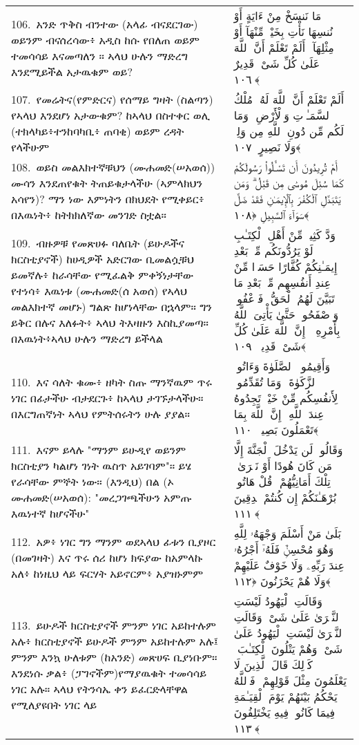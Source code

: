 \documentclass[11pt,a4paper,oneside]{article}%
\newcommand{\mytextarabic}[1]{\textarabic{ #1 \flushright}}
\begin{document}
\begin{longtable}{%
  @{}
    p{}
  @{~~~}
    p{}
    @{}
}
106.\ አንድ ጥቅስ ብንተው (አላፊ ብናደርገው) ወይንም ብናሰረሳው፥ አዲስ ከሱ የበለጠ ወይም ተመሳሳይ እናመጣለን ። ኣላህ ሁሉን ማድረግ እንደሚይችል አታዉቁም ወይ? &  \mytextarabic{مَا نَنسَخْ مِنْ ءَايَةٍ أَوْ نُنسِهَا نَأْتِ بِخَيْرٍۢ مِّنْهَآ أَوْ مِثْلِهَآ ۗ أَلَمْ تَعْلَمْ أَنَّ ٱللَّهَ عَلَىٰ كُلِّ شَىْءٍۢ قَدِيرٌ ﴿١٠٦﴾}\\
107.\ የመሬትና(የምድርና) የሰማይ ግዛት (ስልጣን) የኣላህ እንደሆነ አታውቁም? ከኣላህ በስተቀር ወሊ (ተክላካይ፥ተንከባካቢ፥ ጠባቂ) ወይም ረዳት የላችሁም &  \mytextarabic{ أَلَمْ تَعْلَمْ أَنَّ ٱللَّهَ لَهُۥ مُلْكُ ٱلسَّمَـٰوَٟتِ وَٱلْأَرْضِ ۗ وَمَا لَكُم مِّن دُونِ ٱللَّهِ مِن وَلِىٍّۢ وَلَا نَصِيرٍ ﴿١٠٧﴾}\\
108.\ ወይስ መልእክተኛቹህን (ሙሐመድ(ሠአወሰ)) ሙሳን እንደጠየቁት ትጠይቁታላችሁ (ኣምላክህን አሳየን)? ማን ነው እምነትን በክህደት የሚቀይር፥ በእዉነት፥ ከትክክለኛው መንገድ ስቷል። &  \mytextarabic{ أَمْ تُرِيدُونَ أَن تَسْـَٔلُوا۟ رَسُولَكُمْ كَمَا سُئِلَ مُوسَىٰ مِن قَبْلُ ۗ وَمَن يَتَبَدَّلِ ٱلْكُفْرَ بِٱلْإِيمَـٰنِ فَقَدْ ضَلَّ سَوَآءَ ٱلسَّبِيلِ ﴿١٠٨﴾}\\
109.\ ብዙዎቹ የመጽሀፉ ባለቤት (ይሁዶችና ክርስቲያኖች) ከሀዲዎች አድርገው ቢመልሷቹህ ይመኛሉ፥ ከራሳቸው የሚፈልቅ ምቀኝነታቸው የተነሳ፥ እዉነቱ (ሙሐመድ(ሰ አወሰ) የኣላህ መልእክተኛ መሆኑ) ግልጽ ከሆነላቸው በኋላም። ግን ይቅር በሉና እለፉት፥ ኣላህ ትእዛዙን እስኪያመጣ። በእዉነት፥ኣላህ ሁሉን ማድረግ ይችላል  &  \mytextarabic{وَدَّ كَثِيرٌۭ مِّنْ أَهْلِ ٱلْكِتَـٰبِ لَوْ يَرُدُّونَكُم مِّنۢ بَعْدِ إِيمَـٰنِكُمْ كُفَّارًا حَسَدًۭا مِّنْ عِندِ أَنفُسِهِم مِّنۢ بَعْدِ مَا تَبَيَّنَ لَهُمُ ٱلْحَقُّ ۖ فَٱعْفُوا۟ وَٱصْفَحُوا۟ حَتَّىٰ يَأْتِىَ ٱللَّهُ بِأَمْرِهِۦٓ ۗ إِنَّ ٱللَّهَ عَلَىٰ كُلِّ شَىْءٍۢ قَدِيرٌۭ ﴿١٠٩﴾}\\
110.\ እና ሳለት ቁሙ፥ ዘካት ስጡ ማንኛዉም ጥሩ ነገር በፊታችሁ ብታደርጉ፥ ከኣላህ ታገኙታላችሁ። በእርግጠኛነት ኣላህ የምትሰሩትን ሁሉ ያያል። &  \mytextarabic{ وَأَقِيمُوا۟ ٱلصَّلَوٰةَ وَءَاتُوا۟ ٱلزَّكَوٰةَ ۚ وَمَا تُقَدِّمُوا۟ لِأَنفُسِكُم مِّنْ خَيْرٍۢ تَجِدُوهُ عِندَ ٱللَّهِ ۗ إِنَّ ٱللَّهَ بِمَا تَعْمَلُونَ بَصِيرٌۭ ﴿١١٠﴾}\\
111.\ እናም ይላሉ "ማንም ይሁዲየ ወይንም ክርስቲያን ካልሆነ ገነት ዉስጥ አይገባም"። ይሄ የራሳቸው ምኞት ነው። (እንዲህ) በል (ኦ ሙሐመድ(ሠአወሰ): "መረጋገጫችሁን አምጡ እዉነተኛ ከሆናችሁ"  &  \mytextarabic{وَقَالُوا۟ لَن يَدْخُلَ ٱلْجَنَّةَ إِلَّا مَن كَانَ هُودًا أَوْ نَصَٟرَىٰ ۗ تِلْكَ أَمَانِيُّهُمْ ۗ قُلْ هَاتُوا۟ بُرْهَـٰنَكُمْ إِن كُنتُمْ صَٟدِقِينَ ﴿١١١﴾}\\
112.\ አዎ፥ ነገር ግን ማንም ወደኣላህ ፊቱን ቢያዞር (በመገዛት) እና ጥሩ ሰሪ ከሆነ ክፍያው ከአምላኩ አለ፥ ከነዚህ ላይ ፍርሃት አይኖርም፥ አያዝኑምም  &  \mytextarabic{بَلَىٰ مَنْ أَسْلَمَ وَجْهَهُۥ لِلَّهِ وَهُوَ مُحْسِنٌۭ فَلَهُۥٓ أَجْرُهُۥ عِندَ رَبِّهِۦ وَلَا خَوْفٌ عَلَيْهِمْ وَلَا هُمْ يَحْزَنُونَ ﴿١١٢﴾}\\
113.\ ይሁዶች ክርስቲያኖች ምንም ነገር አይከተሉም አሉ፥ ክርስቲያኖች ይሁዶች ምንም አይከተሉም አሉ፤ ምንም እንኳ ሁለቱም (ከአንድ) መጽሀፍ ቢያነቡም። እንደነሱ ቃል፥ (ፓገኖችም)የማያዉቁት ተመሳሳይ ነገር አሉ። ኣላህ የትንሳኤ ቀን ይፈርድላቸዋል የሚለያዩበት ነገር ላይ  &  \mytextarabic{وَقَالَتِ ٱلْيَهُودُ لَيْسَتِ ٱلنَّصَٟرَىٰ عَلَىٰ شَىْءٍۢ وَقَالَتِ ٱلنَّصَٟرَىٰ لَيْسَتِ ٱلْيَهُودُ عَلَىٰ شَىْءٍۢ وَهُمْ يَتْلُونَ ٱلْكِتَـٰبَ ۗ كَذَٟلِكَ قَالَ ٱلَّذِينَ لَا يَعْلَمُونَ مِثْلَ قَوْلِهِمْ ۚ فَٱللَّهُ يَحْكُمُ بَيْنَهُمْ يَوْمَ ٱلْقِيَـٰمَةِ فِيمَا كَانُوا۟ فِيهِ يَخْتَلِفُونَ ﴿١١٣﴾}\\

\end{longtable}
\end{document}
